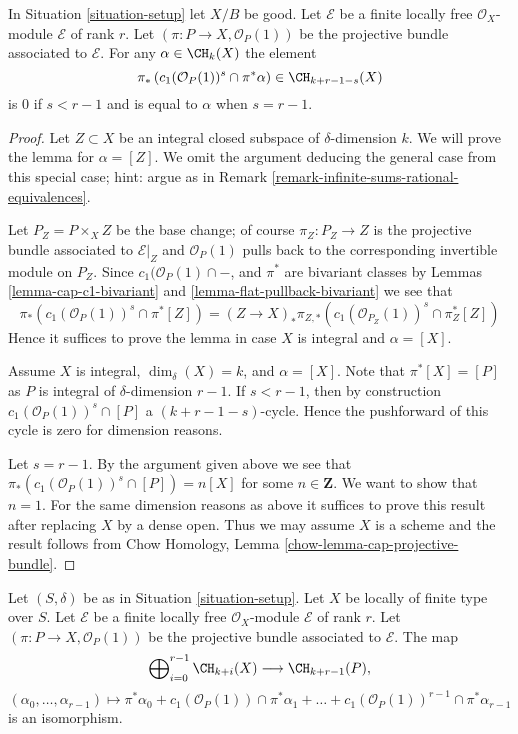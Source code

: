 \begin{lemma}
\label{lemma-cap-projective-bundle}
In Situation \ref{situation-setup} let $X/B$ be good.
Let $\mathcal{E}$ be a finite locally free $\mathcal{O}_X$-module
$\mathcal{E}$ of rank $r$. Let $(\pi : P \to X, \mathcal{O}_P(1))$
be the projective bundle associated to $\mathcal{E}$.
For any $\alpha \in \CH_k(X)$ the element
$$
\pi_*\left(
c_1(\mathcal{O}_P(1))^s \cap \pi^*\alpha
\right)
\in
\CH_{k + r - 1 - s}(X)
$$
is $0$ if $s < r - 1$ and is equal to $\alpha$ when $s = r - 1$.
\end{lemma}

\begin{proof}
Let $Z \subset X$ be an integral closed subspace of $\delta$-dimension $k$.
We will prove the lemma for $\alpha = [Z]$. We omit the argument
deducing the general case from this special case; hint: argue as in
Remark \ref{remark-infinite-sums-rational-equivalences}.

\medskip\noindent
Let $P_Z = P \times_X Z$ be the base change; of course
$\pi_Z : P_Z \to Z$ is the projective bundle associated to $\mathcal{E}|_Z$
and $\mathcal{O}_P(1)$ pulls back to the corresponding
invertible module on $P_Z$. Since $c_1(\mathcal{O}_P(1) \cap -$, and
$\pi^*$ are bivariant classes by Lemmas
\ref{lemma-cap-c1-bivariant} and \ref{lemma-flat-pullback-bivariant}
we see that
$$
\pi_*\left(
c_1(\mathcal{O}_P(1))^s \cap \pi^*[Z]
\right)
=
(Z \to X)_*\pi_{Z, *}\left(
c_1(\mathcal{O}_{P_Z}(1))^s \cap \pi_Z^*[Z]
\right)
$$
Hence it suffices to prove the lemma in case $X$ is integral
and $\alpha  = [X]$.

\medskip\noindent
Assume $X$ is integral, $\dim_\delta(X) = k$, and $\alpha = [X]$.
Note that $\pi^*[X] = [P]$ as $P$ is integral of
$\delta$-dimension $r - 1$. If $s < r - 1$, then by construction
$c_1(\mathcal{O}_P(1))^s \cap [P]$ a $(k + r - 1 - s)$-cycle.
Hence the pushforward of this cycle is zero for dimension reasons.

\medskip\noindent
Let $s = r - 1$. By the argument given above we see that
$\pi_*(c_1(\mathcal{O}_P(1))^s \cap [P]) = n [X]$
for some $n \in \mathbf{Z}$. We want to show that $n = 1$.
For the same dimension reasons as above it suffices to prove this
result after replacing $X$ by a dense open.
Thus we may assume $X$ is a scheme and the result follows
from Chow Homology, Lemma \ref{chow-lemma-cap-projective-bundle}.
\end{proof}

\begin{lemma}
\label{lemma-chow-ring-projective-bundle}
Let $(S, \delta)$ be as in Situation \ref{situation-setup}.
Let $X$ be locally of finite type over $S$.
Let $\mathcal{E}$ be a finite locally free $\mathcal{O}_X$-module
$\mathcal{E}$ of rank $r$. Let $(\pi : P \to X, \mathcal{O}_P(1))$
be the projective bundle associated to $\mathcal{E}$.
The map
$$
\bigoplus\nolimits_{i = 0}^{r - 1}
\CH_{k + i}(X)
\longrightarrow
\CH_{k + r - 1}(P),
$$
$$
(\alpha_0, \ldots, \alpha_{r-1})
\longmapsto
\pi^*\alpha_0 +
c_1(\mathcal{O}_P(1)) \cap \pi^*\alpha_1
+ \ldots +
c_1(\mathcal{O}_P(1))^{r - 1} \cap \pi^*\alpha_{r-1}
$$
is an isomorphism.
\end{lemma}

